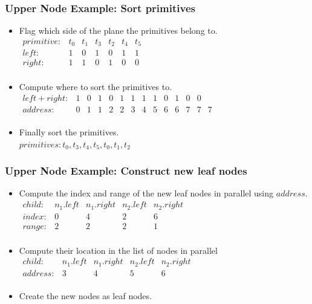 \documentclass{beamer}
\begin{document}
\begin{frame}
  \frametitle{Upper Node Example: Sort primitives}
  
  \begin{itemize}
  \item Flag which side of the plane the primitives belong to.\\
    $\begin{array}{lcccccc}
      primitive: & t_0 & t_1 & t_3 & t_2 & t_4 & t_5 \\
      left:  & 1 & 0 & 1 & 0 & 1 & 1 \\
      right: & 1 & 1 & 0 & 1 & 0 & 0 \\
    \end{array}$
  \item Compute where to sort the primitives to.\\
    $\begin{array}{lccccccccccccc}
      left+right: & 1 & 0 & 1 & 0 & 1 & 1 & 1 & 1 & 0 & 1 & 0 & 0 \\
      address:    & 0 & 1 & 1 & 2 & 2 & 3 & 4 & 5 & 6 & 6 & 7 & 7 & 7 \\
    \end{array}$
  \item Finally sort the primitives.\\
    $primitives: t_0, t_3, t_4, t_5, t_0, t_1, t_2$
  \end{itemize}
\end{frame}

\begin{frame}
  \frametitle{Upper Node Example: Construct new leaf nodes}
  \begin{itemize}
    \item Compute the index and range of the new leaf nodes in parallel using
      $address$.\\
      $\begin{array}{lcccc}
        child: & n_1.left & n_1.right & n_2.left & n_2.right \\
        index: & 0 & 4 & 2 & 6 \\
        range: & 2 & 2 & 2 & 1 \\
      \end{array}$
    \item Compute their location in the list of nodes in parallel\\
      $\begin{array}{lcccc}
        child: & n_1.left & n_1.right & n_2.left & n_2.right \\
        address: & 3 & 4 & 5 & 6 \\
      \end{array}$
    \item Create the new nodes as leaf nodes.\\
  \end{itemize}
\end{frame}
\end{document}

